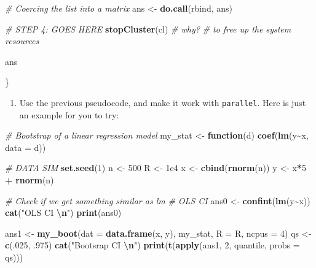 \documentclass[
]{article}
\newenvironment{Shaded}{\begin{snugshade}}{\end{snugshade}}
\newcommand{\AttributeTok}[1]{\textcolor[rgb]{0.13,0.29,0.53}{#1}}
\newcommand{\CommentTok}[1]{\textcolor[rgb]{0.56,0.35,0.01}{\textit{#1}}}
\newcommand{\ControlFlowTok}[1]{\textcolor[rgb]{0.13,0.29,0.53}{\textbf{#1}}}
\newcommand{\DecValTok}[1]{\textcolor[rgb]{0.00,0.00,0.81}{#1}}
\newcommand{\FloatTok}[1]{\textcolor[rgb]{0.00,0.00,0.81}{#1}}
\newcommand{\FunctionTok}[1]{\textcolor[rgb]{0.13,0.29,0.53}{\textbf{#1}}}
\newcommand{\NormalTok}[1]{#1}
\newcommand{\OtherTok}[1]{\textcolor[rgb]{0.56,0.35,0.01}{#1}}
\newcommand{\SpecialCharTok}[1]{\textcolor[rgb]{0.81,0.36,0.00}{\textbf{#1}}}
\newcommand{\StringTok}[1]{\textcolor[rgb]{0.31,0.60,0.02}{#1}}
\providecommand{\tightlist}{%
  \setlength{\itemsep}{0pt}\setlength{\parskip}{0pt}}
\begin{document}
\begin{Shaded}
\begin{Highlighting}[]
  \CommentTok{\# Coercing the list into a matrix}
\NormalTok{  ans }\OtherTok{\textless{}{-}} \FunctionTok{do.call}\NormalTok{(rbind, ans)}
  
  \CommentTok{\# STEP 4: GOES HERE}
  \FunctionTok{stopCluster}\NormalTok{(cl)}
  \CommentTok{\# why? }
    \CommentTok{\# to free up the system resources }
  
\NormalTok{  ans}
  
\NormalTok{\}}
\end{Highlighting}
\end{Shaded}

\begin{enumerate}
\def\labelenumi{\arabic{enumi}.}
\tightlist
\item
  Use the previous pseudocode, and make it work with \texttt{parallel}.
  Here is just an example for you to try:
\end{enumerate}

\begin{Shaded}
\begin{Highlighting}[]
\CommentTok{\# Bootstrap of a linear regression model}
\NormalTok{my\_stat }\OtherTok{\textless{}{-}} \ControlFlowTok{function}\NormalTok{(d)  }\FunctionTok{coef}\NormalTok{(}\FunctionTok{lm}\NormalTok{(y}\SpecialCharTok{\textasciitilde{}}\NormalTok{x, }\AttributeTok{data =}\NormalTok{ d))}

\CommentTok{\# DATA SIM}
\FunctionTok{set.seed}\NormalTok{(}\DecValTok{1}\NormalTok{)}
\NormalTok{n }\OtherTok{\textless{}{-}} \DecValTok{500} 
\NormalTok{R }\OtherTok{\textless{}{-}} \FloatTok{1e4}
\NormalTok{x }\OtherTok{\textless{}{-}} \FunctionTok{cbind}\NormalTok{(}\FunctionTok{rnorm}\NormalTok{(n)) }
\NormalTok{y }\OtherTok{\textless{}{-}}\NormalTok{ x}\SpecialCharTok{*}\DecValTok{5} \SpecialCharTok{+} \FunctionTok{rnorm}\NormalTok{(n)}

\CommentTok{\# Check if we get something similar as lm}
\CommentTok{\# OLS CI }
\NormalTok{ans0 }\OtherTok{\textless{}{-}} \FunctionTok{confint}\NormalTok{(}\FunctionTok{lm}\NormalTok{(y}\SpecialCharTok{\textasciitilde{}}\NormalTok{x))}
\FunctionTok{cat}\NormalTok{(}\StringTok{"OLS CI }\SpecialCharTok{\textbackslash{}n}\StringTok{"}\NormalTok{)}
\FunctionTok{print}\NormalTok{(ans0)}

\NormalTok{ans1 }\OtherTok{\textless{}{-}} \FunctionTok{my\_boot}\NormalTok{(}\AttributeTok{dat =} \FunctionTok{data.frame}\NormalTok{(x, y), my\_stat, }\AttributeTok{R =}\NormalTok{ R, }\AttributeTok{ncpus =} \DecValTok{4}\NormalTok{)}
\NormalTok{qs }\OtherTok{\textless{}{-}} \FunctionTok{c}\NormalTok{(.}\DecValTok{025}\NormalTok{, .}\DecValTok{975}\NormalTok{)}
\FunctionTok{cat}\NormalTok{(}\StringTok{"Bootsrap CI }\SpecialCharTok{\textbackslash{}n}\StringTok{"}\NormalTok{)}
\FunctionTok{print}\NormalTok{(}\FunctionTok{t}\NormalTok{(}\FunctionTok{apply}\NormalTok{(ans1, }\DecValTok{2}\NormalTok{, quantile, }\AttributeTok{probs =}\NormalTok{ qs)))}
\end{Highlighting}
\end{Shaded}
\end{document}
